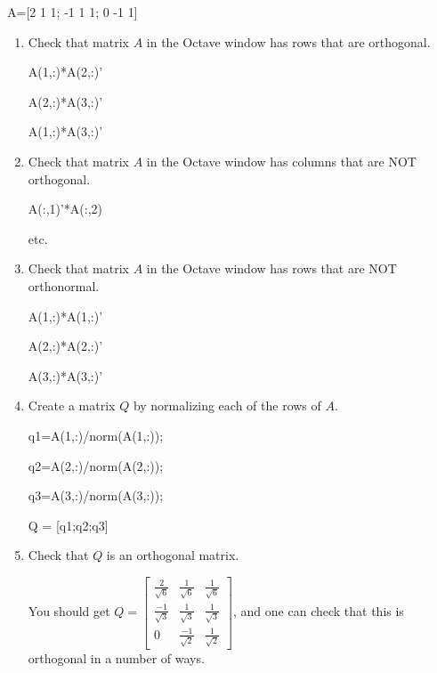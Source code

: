 \documentclass{ximera}
\begin{document}
\begin{exploration}\label{exp:make_orthogonal}
A=[2 1 1; -1 1 1; 0 -1 1]
\begin{enumerate}
    \item Check that matrix $A$ in the Octave window has rows that are orthogonal.
    \begin{hint}
    A(1,:)*A(2,:)' 
    
    A(2,:)*A(3,:)' 
    
    A(1,:)*A(3,:)' 
    
    \end{hint}
    \item Check that matrix $A$ in the Octave window has columns that are NOT orthogonal.
    \begin{hint}
    A(:,1)'*A(:,2) 
    
    etc.
    
    \end{hint}
    \item Check that matrix $A$ in the Octave window has rows that are NOT orthonormal.
    \begin{hint}
    A(1,:)*A(1,:)' 
    
    A(2,:)*A(2,:)' 
    
    A(3,:)*A(3,:)' 
    
    \end{hint}
    \item Create a matrix $Q$ by normalizing each of the rows of $A$.
    \begin{hint}
    q1=A(1,:)/norm(A(1,:)); 
    
    q2=A(2,:)/norm(A(2,:));
    
    q3=A(3,:)/norm(A(3,:));
    
    Q = [q1;q2;q3]
    
    \end{hint}
    \item Check that $Q$ is an orthogonal matrix.
    \begin{hint}
    You should get $Q = \begin{bmatrix}
\frac{2}{\sqrt{6}} & \frac{1}{\sqrt{6}} & \frac{1}{\sqrt{6}} \\
\frac{-1}{\sqrt{3}} & \frac{1}{\sqrt{3}} & \frac{1}{\sqrt{3}} \\
0 & \frac{-1}{\sqrt{2}} & \frac{1}{\sqrt{2}}
\end{bmatrix}$, and one can check that this is orthogonal in a number of ways.
    \end{hint}
\end{enumerate}

\end{exploration}
\end{document}

